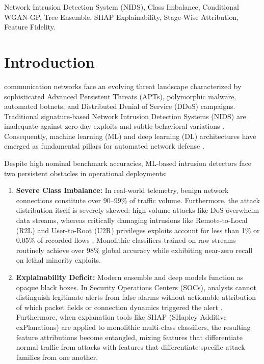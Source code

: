 \documentclass[journal]{IEEEtran}
\begin{document}
\begin{IEEEkeywords}
Network Intrusion Detection System (NIDS), Class Imbalance, Conditional WGAN-GP, Tree Ensemble, SHAP Explainability, Stage-Wise Attribution, Feature Fidelity.
\end{IEEEkeywords}

\section{Introduction}
 communication networks face an evolving threat landscape characterized by sophisticated Advanced Persistent Threats (APTs), polymorphic malware, automated botnets, and Distributed Denial of Service (DDoS) campaigns. Traditional signature-based Network Intrusion Detection Systems (NIDS) are inadequate against zero-day exploits and subtle behavioral variations \cite{barnard2022robust}. Consequently, machine learning (ML) and deep learning (DL) architectures have emerged as fundamental pillars for automated network defense \cite{mahmoud2025xi2s, bibers2025ensemble}. 

Despite high nominal benchmark accuracies, ML-based intrusion detectors face two persistent obstacles in operational deployments:
\begin{enumerate}
    \item \textbf{Severe Class Imbalance:} In real-world telemetry, benign network connections constitute over 90--99\% of traffic volume. Furthermore, the attack distribution itself is severely skewed: high-volume attacks like DoS overwhelm data streams, whereas critically damaging intrusions like Remote-to-Local (R2L) and User-to-Root (U2R) privileges exploits account for less than 1\% or 0.05\% of recorded flows \cite{tavallaee2009detailed, zhang2020network}. Monolithic classifiers trained on raw streams routinely achieve over 98\% global accuracy while exhibiting near-zero recall on lethal minority exploits.
    \item \textbf{Explainability Deficit:} Modern ensemble and deep models function as opaque black boxes. In Security Operations Centers (SOCs), analysts cannot distinguish legitimate alerts from false alarms without actionable attribution of which packet fields or connection dynamics triggered the alert \cite{haque2026explainable, alonso2026forensic}. Furthermore, when explanation tools like SHAP (SHapley Additive exPlanations) \cite{lundberg2017unified} are applied to monolithic multi-class classifiers, the resulting feature attributions become entangled, mixing features that differentiate normal traffic from attacks with features that differentiate specific attack families from one another.
\end{enumerate}
\end{document}
